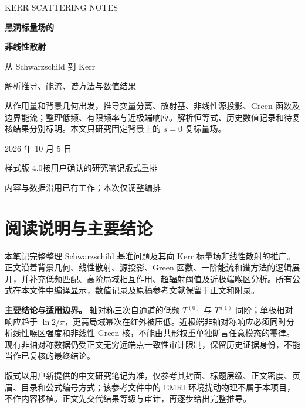 \documentclass[UTF8,fontset=fandol,11pt,a4paper,oneside]{ctexart}
\numberwithin{equation}{section}
\begin{document}
\hypersetup{pageanchor=false}
\begin{titlepage}\centering\vspace*{28mm}
{\small\color{ink} KERR SCATTERING NOTES\par}\vspace{18mm}
{\LARGE\bfseries 黑洞标量场的\par}\vspace{9mm}
{\LARGE\bfseries 非线性散射\par}\vspace{13mm}
{\large 从 Schwarzschild 到 Kerr\par}\vspace{8mm}
{\normalsize 解析推导、能流、谱方法与数值结果\par}\vspace{16mm}
\begin{minipage}{0.86\textwidth}\begin{note}
从作用量和背景几何出发，推导变量分离、散射基、非线性源投影、Green 函数及边界能流；整理低频、有限频率与近极端响应。解析恒等式、历史数值记录和待复核结果分别标明。本文只研究固定背景上的 $s=0$ 复标量场。
\end{note}\end{minipage}
\vfill{\normalsize 2026 年 10 月 5 日\par}\vspace{4mm}
{\small 样式版 4.0\quad 按用户确认的研究笔记版式重排\par}\vspace{2mm}
{\small 内容与数据沿用已有工作；本次仅调整编排\par}
\end{titlepage}
\hypersetup{pageanchor=true}
\section*{阅读说明与主要结论}
本笔记完整整理 Schwarzschild 基准问题及其向 Kerr 标量场非线性散射的推广。正文沿着背景几何、线性散射、源投影、Green 函数、一阶能流和谱方法的逻辑展开，并补充低频匹配、高阶局域相互作用、超辐射阈值及近极端喉区分析。所有公式在本文件中编译显示，数值记录及原稿参考文献保留于正文和附录。
\begin{note}
\textbf{主要结论与适用边界。} 轴对称三次自通道的低频 $T^{(0)}$ 与 $T^{(1)}$ 同阶；单极相对响应趋于 $\ln2/\pi$，更高局域幂次在红外被压低。近极端非轴对称响应必须同时分析线性喉区强度和非线性 Green 核，不能由共形权重单独断言任意模态的幂律。现有非轴对称数据仍受正文无穷远端点一致性审计限制，保留历史证据身份，不能当作已复核的最终结论。
\end{note}
版式以用户新提供的中文研究笔记为准，仅参考其封面、标题层级、正文密度、页眉、目录和公式编号方式；该参考文件中的 EMRI 环境扰动物理不属于本项目，不作内容移植。正文先交代结果等级与审计，再逐步给出完整推导。
\tableofcontents
\clearpage
\end{document}
